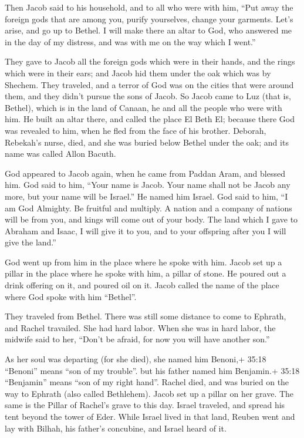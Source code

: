  Then Jacob said to his household, and to all who were with
him, ``Put away the foreign gods that are among you, purify yourselves,
change your garments.  Let's arise, and go up to Bethel. I
will make there an altar to God, who answered me in the day of my
distress, and was with me on the way which I went.''

 They gave to Jacob all the foreign gods which were in their
hands, and the rings which were in their ears; and Jacob hid them under
the oak which was by Shechem.  They traveled, and a terror
of God was on the cities that were around them, and they didn't pursue
the sons of Jacob.  So Jacob came to Luz (that is, Bethel),
which is in the land of Canaan, he and all the people who were with him.
 He built an altar there, and called the place El Beth El;
because there God was revealed to him, when he fled from the face of his
brother.  Deborah, Rebekah's nurse, died, and she was buried
below Bethel under the oak; and its name was called Allon Bacuth.

 God appeared to Jacob again, when he came from Paddan Aram,
and blessed him.  God said to him, ``Your name is Jacob.
Your name shall not be Jacob any more, but your name will be Israel.''
He named him Israel.  God said to him, ``I am God Almighty.
Be fruitful and multiply. A nation and a company of nations will be from
you, and kings will come out of your body.  The land which
I gave to Abraham and Isaac, I will give it to you, and to your
offspring after you I will give the land.''

 God went up from him in the place where he spoke with him.
 Jacob set up a pillar in the place where he spoke with
him, a pillar of stone. He poured out a drink offering on it, and poured
oil on it.  Jacob called the name of the place where God
spoke with him ``Bethel''.

 They traveled from Bethel. There was still some distance
to come to Ephrath, and Rachel travailed. She had hard labor.
 When she was in hard labor, the midwife said to her,
``Don't be afraid, for now you will have another son.''

 As her soul was departing (for she died), she named him
Benoni,+ 35:18 ``Benoni'' means ``son of my trouble''. but his father
named him Benjamin.+ 35:18 ``Benjamin'' means ``son of my right hand''.
 Rachel died, and was buried on the way to Ephrath (also
called Bethlehem).  Jacob set up a pillar on her grave. The
same is the Pillar of Rachel's grave to this day.  Israel
traveled, and spread his tent beyond the tower of Eder. 
While Israel lived in that land, Reuben went and lay with Bilhah, his
father's concubine, and Israel heard of it.

